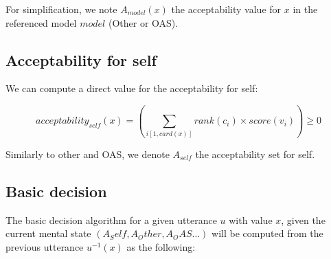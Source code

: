 \documentclass{article}
\begin{document}
For simplification, we note $A_{model}(x)$ the acceptability value for $x$ in the referenced model $model$ (Other or OAS).

\subsection{Acceptability for self}

We can compute a direct value for the acceptability for self:

$$acceptability_{self}(x) = \left(\sum_{i[1,card(x)]} rank(c_i)\times score(v_i)\right)\geq0$$

Similarly to other and OAS, we denote $A_{self}$ the acceptability set for self.

\subsection{Basic decision}

The basic decision algorithm for a given utterance $u$ with value $x$, given the current mental state $(A_Self,A_Other,A_OAS...)$ will be computed from the previous utterance $u ^{-1}(x)$ as the following:
\end{document}
